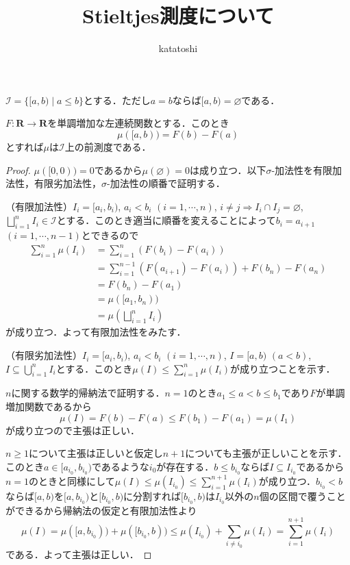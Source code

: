 \documentclass[12pt,a4paper]{jsarticle}
\newcommand{\real}{\mathbf{R}}
\newcommand{\calI}{\mathcal{I}}
\begin{document}
\title{Stieltjes測度について}
\author{katatoshi}
\maketitle

$\calI = \{[a, b) \mid a \leq b\}$とする．ただし$a = b$ならば$[a, b) = \varnothing$である．
\begin{proposition}
    $F\colon \real \to \real$を単調増加な左連続関数とする．このとき
    \begin{equation*}
        \mu([a, b)) = F(b) - F(a)
    \end{equation*}
    とすれば$\mu$は$\calI$上の前測度である．
\end{proposition}
\begin{proof}
    $\mu([0, 0)) = 0$であるから$\mu(\varnothing) = 0$は成り立つ．以下$\sigma$-加法性を有限加法性，有限劣加法性，$\sigma$-加法性の順番で証明する．

    （有限加法性）$I_i = [a_i, b_i)$, $a_i < b_i$ $(i = 1, \cdots, n)$, $i \not= j \Rightarrow I_i \cap I_j = \varnothing$, $\bigsqcup_{i = 1}^n I_i \in \calI$とする．このとき適当に順番を変えることによって$b_i = a_{i + 1}$ $(i = 1, \cdots, n - 1)$とできるので
    \begin{align*}
        \sum_{i = 1}^n \mu(I_i)
        &= \sum_{i = 1}^n (F(b_i) - F(a_i)) \\
        &= \sum_{i = 1}^{n - 1} (F(a_{i + 1}) - F(a_i)) + F(b_n) - F(a_n) \\
        &= F(b_n) - F(a_1) \\
        &= \mu([a_1, b_n)) \\
        &= \mu\left(\bigsqcup_{i = 1}^n I_i\right)
    \end{align*}
    が成り立つ．よって有限加法性をみたす．

    （有限劣加法性）$I_i = [a_i, b_i)$, $a_i < b_i$ $(i = 1, \cdots, n)$, $I = [a, b)$ $(a < b)$, $I \subseteq \bigcup_{i = 1}^n I_i$とする．このとき$\mu(I) \leq \sum_{i = 1}^n \mu(I_i)$が成り立つことを示す．

    $n$に関する数学的帰納法で証明する．$n = 1$のとき$a_1 \leq a < b \leq b_1$であり$F$が単調増加関数であるから
    \begin{equation*}
        \mu(I) = F(b) - F(a) \leq F(b_1) - F(a_1) = \mu(I_1)
    \end{equation*}
    が成り立つので主張は正しい．

    $n \geq 1$について主張は正しいと仮定し$n + 1$についても主張が正しいことを示す．このとき$a \in [a_{i_0}, b_{i_0})$であるような$i_0$が存在する．$b \leq b_{i_0}$ならば$I \subseteq I_{i_0}$であるから$n = 1$のときと同様にして$\mu(I) \leq \mu(I_{i_0}) \leq \sum_{i = 1}^{n + 1} \mu(I_i)$が成り立つ．$b_{i_0} < b$ならば$[a, b)$を$[a, b_{i_0})$と$[b_{i_0}, b)$に分割すれば$[b_{i_0}, b)$は$I_{i_0}$以外の$n$個の区間で覆うことができるから帰納法の仮定と有限加法性より
    \begin{equation*}
        \mu(I) = \mu([a, b_{i_0})) + \mu([b_{i_0}, b)) \leq \mu(I_{i_0}) + \sum_{i \not= i_0} \mu(I_i) = \sum_{i = 1}^{n + 1} \mu(I_i)
    \end{equation*}
    である．よって主張は正しい．


\end{proof}
\end{document}
